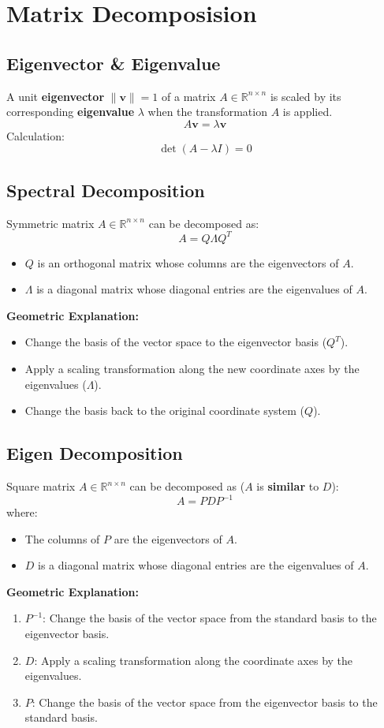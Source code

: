 \documentclass{article}
\begin{document}
\newpage
\section{Matrix Decomposision}

\subsection{Eigenvector \& Eigenvalue}

A unit \textbf{eigenvector} $\|\mathbf{v}\| = 1$ of a matrix $A \in \mathbb{R}^{n \times n}$ is scaled by its corresponding \textbf{eigenvalue} $\lambda$ when the transformation $A$ is applied.
\[
    A\mathbf{v} = \lambda \mathbf{v}
\]
Calculation:
\[
    \det(A - \lambda I) = 0
\]

\subsection{Spectral Decomposition}

Symmetric matrix $A \in \mathbb{R}^{n \times n}$ can be decomposed as:
\[
    A = Q \Lambda Q^T
\]
\begin{itemize}
    \item $Q$ is an orthogonal matrix whose columns are the eigenvectors of $A$.
    \item $\Lambda$ is a diagonal matrix whose diagonal entries are the eigenvalues of $A$.
\end{itemize}
\textbf{Geometric Explanation:}
\begin{itemize}
    \item Change the basis of the vector space to the eigenvector basis ($Q^T$).
    \item Apply a scaling transformation along the new coordinate axes by the eigenvalues ($\Lambda$).
    \item Change the basis back to the original coordinate system ($Q$).
\end{itemize}

\subsection{Eigen Decomposition}

Square matrix $A \in \mathbb{R}^{n \times n}$ can be decomposed as ($A$ is \textbf{similar} to $D$):
\[
    A = PDP^{-1}
\]
where:
\begin{itemize}
    \item The columns of $P$ are the eigenvectors of $A$.
    \item $D$ is a diagonal matrix whose diagonal entries are the eigenvalues of $A$.
\end{itemize}
\textbf{Geometric Explanation:}
\begin{enumerate}
    \item $P^{-1}$: Change the basis of the vector space from the standard basis to the eigenvector basis.
    \item $D$: Apply a scaling transformation along the coordinate axes by the eigenvalues.
    \item $P$: Change the basis of the vector space from the eigenvector basis to the standard basis.
\end{enumerate}
\end{document}
